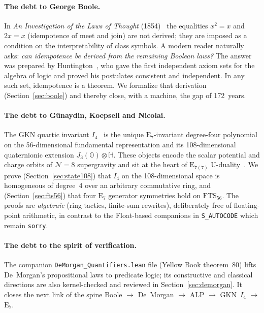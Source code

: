\documentclass[11pt]{article}
\theoremstyle{definition}
\newcommand{\OO}{\mathbb{O}}
\newcommand{\HH}{\mathbb{H}}
\newcommand{\Jthree}{J_3(\OO)}
\newcommand{\Iq}{I_4}
\newcommand{\FTS}{\mathrm{FTS}_{56}}
\newcommand{\Eseven}{\mathrm{E}_7}
\begin{document}
\paragraph{The debt to George Boole.}
In \emph{An Investigation of the Laws of Thought} (1854)~\cite{boole1854} the
equalities $x^2=x$ and $2x=x$ (idempotence of meet and join) are not derived;
they are imposed as a condition on the interpretability of class symbols. A
modern reader naturally asks: \emph{can idempotence be derived from the
remaining Boolean laws?} The answer was prepared by Huntington~\cite
{huntington1904}, who gave the first independent axiom sets for the algebra of
logic and proved his postulates consistent and independent. In any such set,
idempotence is a theorem. We formalize that derivation (Section~\ref{sec:boole})
and thereby close, with a machine, the gap of 172~years.

\paragraph{The debt to Günaydin, Koepsell and Nicolai.}
The GKN quartic invariant $\Iq$~\cite{gkn2001} is the unique
$\mathrm{E}_7$-invariant degree-four polynomial on the 56-dimensional
fundamental representation and its 108-dimensional quaternionic extension
$\Jthree\otimes\HH$. These objects encode the scalar potential and charge
orbits of $\mathcal{N}=8$ supergravity and sit at the heart of
$\mathrm{E}_{7(7)}$ U-duality~\cite{cremmerjulia1979}. We prove
(Section~\ref{sec:state108}) that $\Iq$ on the 108-dimensional space is
homogeneous of degree~4 over an arbitrary commutative ring, and
(Section~\ref{sec:fts56}) that four $\mathrm{E}_7$ generator symmetries hold
on $\FTS$. The proofs are \emph{algebraic} (ring tactics, finite-sum
rewrites), deliberately free of floating-point arithmetic, in contrast to the
Float-based companions in \texttt{S\_AUTOCODE} which remain \texttt{sorry}.

\paragraph{The debt to the spirit of verification.}
The companion \texttt{DeMorgan\_Quantifiers.lean} file (Yellow Book
theorem~80) lifts De~Morgan's propositional laws to predicate logic; its
constructive and classical directions are also kernel-checked and reviewed in
Section~\ref{sec:demorgan}. It closes the next link of the spine
Boole $\to$ De~Morgan $\to$ ALP $\to$ GKN~$\Iq$ $\to$ $\Eseven$.
\end{document}
